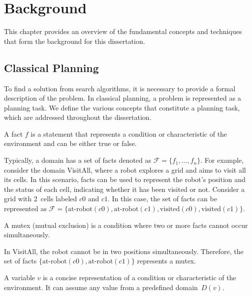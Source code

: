 \chapter{Background}
\label{sec:background}

This chapter provides an overview of the fundamental concepts and techniques that form the background for this dissertation.

\section{Classical Planning}
\label{sec:background_classicalplanning}

To find a solution from search algorithms, it is necessary to provide a formal description of the problem. In classical planning, a problem is represented as a planning task. We define the various concepts that constitute a planning task, which are addressed throughout the dissertation.

\begin{definition}[Fact]\label{def:fact}
    A fact $f$ is a statement that represents a condition or characteristic of the environment and can be either true or false.
\end{definition}

Typically, a domain has a set of facts denoted as $\mathcal{F} = \{f_1, \ldots, f_n\}$. For example, consider the domain VisitAll, where a robot explores a grid and aims to visit all its cells. In this scenario, facts can be used to represent the robot's position and the status of each cell, indicating whether it has been visited or not. Consider a grid with 2~cells labeled $c0$ and $c1$. In this case, the set of facts can be represented as $\mathcal{F} = \{\text{at-robot}(c0),\text{at-robot}(c1),\text{visited}(c0),\text{visited}(c1)\}$.

\begin{definition}[Mutex]\label{def:mutex}
    A mutex (mutual exclusion) is a condition where two or more facts cannot occur simultaneously.
\end{definition}

In VisitAll, the robot cannot be in two positions simultaneously. Therefore, the set of facts $\{\text{at-robot}(c0),\text{at-robot}(c1)\}$ represents a mutex.

\begin{definition}[Variable]\label{def:variable}
    A variable $v$ is a concise representation of a condition or characteristic of the environment. It can assume any value from a predefined domain~$D(v)$.
\end{definition}

